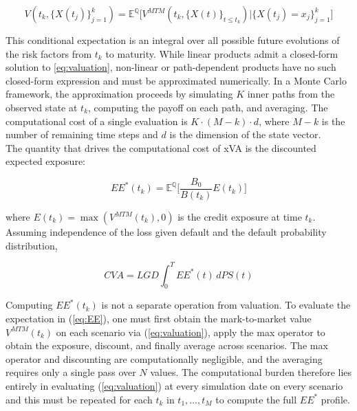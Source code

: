     \begin{equation}\label{eq:valuation}
    V(t_k,\{X(t_j)\}_{j=1}^{k}) = \mathbb{E}^{\mathbb{Q}} \Big[ V^{MTM}(t_k,\{X(t)\}_{t \leq t_k}) \Big| \{X(t_j) = x_j\}_{j=1}^{k} \Big]
    \end{equation}

    \noindent
    This conditional expectation is an integral over all possible future evolutions of the risk factors from $t_k$ to maturity. While linear products admit a closed-form solution to \ref{eq:valuation}, non-linear or path-dependent products have no such closed-form expression and must be approximated numerically. In a Monte Carlo framework, the approximation proceeds by simulating $K$ inner paths from the observed state at $t_k$, computing the payoff
    on each path, and averaging. The computational cost of a single evaluation is $K \cdot (M - k) \cdot d$, where $M - k$ is the number of remaining time steps and $d$ is the dimension of the
    state vector.\\

    \noindent
    The quantity that drives the computational cost of xVA is the discounted expected exposure:

    \begin{equation}\label{eq:EE}
    EE^{*}(t_k) = \mathbb{E}^{\mathbb{Q}} \Big[ \frac{B_0}{B(t_k)} E(t_k) \Big]
    \end{equation}
    
    \noindent
    where $E(t_k) = \max(V^{MTM}(t_k), 0)$ is the credit exposure at time $t_k$. Assuming independence of the loss given default and the default probability distribution,

    \begin{equation}\label{eq:cva}
        CVA = LGD \int_{0}^{T} EE^{*}(t) \, dPS(t)
    \end{equation}

    \noindent
    Computing $EE^{*}(t_k)$ is not a separate operation from valuation. To evaluate the expectation in (\ref{eq:EE}), one must first obtain the mark-to-market value $V^{MTM}(t_k)$ on each scenario via (\ref{eq:valuation}), apply the max operator to obtain the exposure, discount, and finally average across scenarios. The max operator and discounting are computationally negligible, and the averaging requires only a single pass over $N$ values. The computational burden therefore lies entirely in evaluating (\ref{eq:valuation}) at every simulation date on every scenario and this must be repeated for each $t_k$ in ${t_1, \ldots, t_M}$ to compute the full $EE^{*}$ profile.
    
